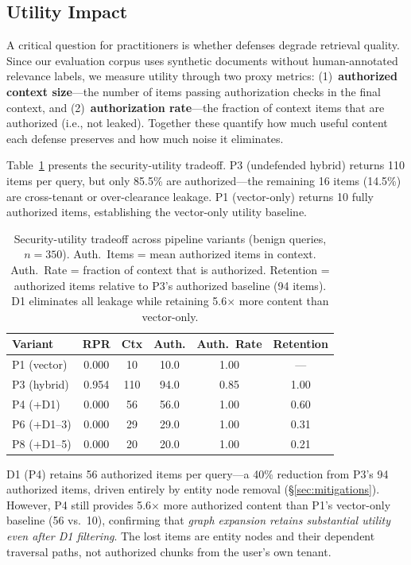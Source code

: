 \documentclass[letterpaper,twocolumn,10pt]{article}
\begin{document}
\subsection{Utility Impact}
\label{sec:utility}

A critical question for practitioners is whether defenses degrade
retrieval quality. Since our evaluation corpus uses synthetic documents
without human-annotated relevance labels, we measure utility through two
proxy metrics: (1)~\textbf{authorized context size}---the number of
items passing authorization checks in the final context, and
(2)~\textbf{authorization rate}---the fraction of context items that are
authorized (i.e., not leaked). Together these quantify how much useful
content each defense preserves and how much noise it eliminates.

Table~\ref{tab:utility} presents the security-utility tradeoff. P3
(undefended hybrid) returns 110 items per query, but only 85.5\% are
authorized---the remaining 16 items (14.5\%) are cross-tenant or
over-clearance leakage. P1 (vector-only) returns 10 fully authorized
items, establishing the vector-only utility baseline.

\begin{table}[t]
\centering
\caption{Security-utility tradeoff across pipeline variants
  (benign queries, $n{=}350$). Auth.\ Items = mean authorized items in
  context. Auth.\ Rate = fraction of context that is authorized.
  Retention = authorized items relative to P3's authorized baseline
  (94 items). D1 eliminates all leakage while retaining 5.6$\times$
  more content than vector-only.}
\label{tab:utility}
\small
\begin{tabular}{l|ccccc}
\toprule
\textbf{Variant} & \textbf{RPR} & \textbf{Ctx}
  & \textbf{Auth.} & \textbf{Auth.\ Rate} & \textbf{Retention} \\
\midrule
P1 (vector) & 0.000 & 10 & 10.0 & 1.00 & --- \\
P3 (hybrid) & 0.954 & 110 & 94.0 & 0.85 & 1.00 \\
P4 (+D1) & 0.000 & 56 & 56.0 & 1.00 & 0.60 \\
P6 (+D1--3) & 0.000 & 29 & 29.0 & 1.00 & 0.31 \\
P8 (+D1--5) & 0.000 & 20 & 20.0 & 1.00 & 0.21 \\
\bottomrule
\end{tabular}
\end{table}

D1 (P4) retains 56 authorized items per query---a 40\% reduction from
P3's 94 authorized items, driven entirely by entity node removal
(\S\ref{sec:mitigations}). However, P4 still provides
5.6$\times$ more authorized content than P1's vector-only baseline (56
vs.\ 10), confirming that \emph{graph expansion retains substantial
utility even after D1 filtering}. The lost items are entity nodes and
their dependent traversal paths, not authorized chunks from the user's
own tenant.
\end{document}

